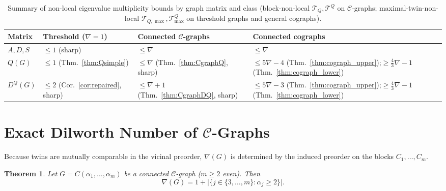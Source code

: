 \documentclass[11pt,a4paper]{article}
\newtheorem{theorem}{Theorem}[section]
\theoremstyle{definition}
\begin{document}
\begin{table}[!htbp]
  \centering
  \caption{Summary of non-local eigenvalue multiplicity bounds by graph matrix and class (block-non-local $\mathcal{T}_Q, \mathcal{T}^Q$ on $\mathcal{C}$-graphs; maximal-twin-non-local $\mathcal{T}_{Q,\max}, \mathcal{T}^Q_{\max}$ on threshold graphs and general cographs).}
  \label{tab:dichotomy}
  \begin{tabularx}{\linewidth}{lXX>{\raggedright\arraybackslash}X}
    \toprule
    Matrix & Threshold ($\nabla=1$) & Connected $\mathcal{C}$-graphs & Connected cographs \\
    \midrule
    $A, D, S$ & $\le 1$ (sharp) & $\le \nabla$ & $\le \nabla$~\cite{Ghorbani2019,LL2021,LWB2024} \\
    $Q(G)$ & $\le 1$ (Thm.~\ref{thm:Qsimple}) & $\le \nabla$ (Thm.~\ref{thm:CgraphQ}, sharp) & $\le 5\nabla - 4$ (Thm.~\ref{thm:cograph_upper});\newline $\ge \frac{4}{3}\nabla - 1$ (Thm.~\ref{thm:cograph_lower}) \\
    $D^Q(G)$ & $\le 2$ (Cor.~\ref{cor:repaired}, sharp) & $\le \nabla + 1$ (Thm.~\ref{thm:CgraphDQ}, sharp) & $\le 5\nabla - 3$ (Thm.~\ref{thm:cograph_upper});\newline $\ge \frac{4}{3}\nabla - 1$ (Thm.~\ref{thm:cograph_lower}) \\
    \bottomrule
  \end{tabularx}
\end{table}

\section{Exact Dilworth Number of $\mathcal{C}$-Graphs}\label{sec:dilworth}

Because twins are mutually comparable in the vicinal preorder, $\nabla(G)$ is determined by the induced preorder on the blocks $C_1,\dots,C_m$.

\begin{theorem}\label{thm:dilworth}
  Let $G = C(\alpha_1,\dots,\alpha_m)$ be a connected $\mathcal{C}$-graph ($m \ge 2$ even). Then
  \[
    \nabla(G) = 1 + \bigl|\{j \in \{3, \dots, m\} : \alpha_j \ge 2\}\bigr|.
  \]
\end{theorem}
\end{document}
